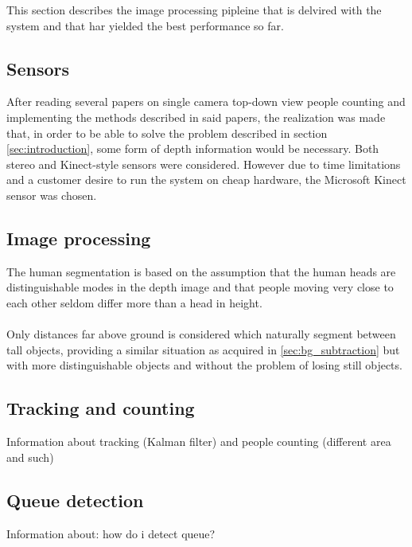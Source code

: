 This section describes the image processing pipleine that is delvired with the system and that har yielded the best performance so far.

\subsection{Sensors}
After reading several papers on single camera top-down view people counting and implementing the methods described in said papers, the realization was made that, in order to be able to solve the problem described in section \ref{sec:introduction}, some form of depth information would be necessary. Both stereo and Kinect-style sensors were considered. However due to time limitations and a customer desire to run the system on cheap hardware, the Microsoft Kinect sensor was chosen.

\subsection{Image processing}
The human segmentation is based on the assumption that the human heads are distinguishable modes in the depth image and that people moving very close to each other seldom differ more than a head in height.\\
\\
Only distances far above ground is considered which naturally segment between tall objects, providing a similar situation as acquired in \ref{sec:bg_subtraction} but with more distinguishable objects and without the problem of losing still objects. 

\subsection{Tracking and counting}
Information about tracking (Kalman filter) and people counting (different area and such)

\subsection{Queue detection}
Information about: how do i detect queue?

